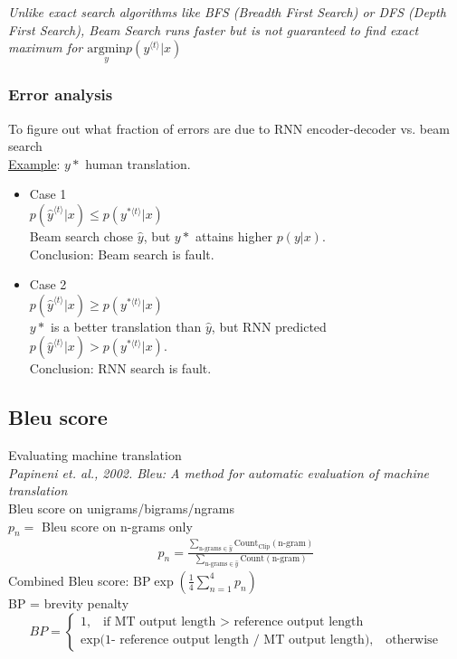 \emph{\textcolor{Bittersweet}{Unlike exact search algorithms like BFS (Breadth First Search) or DFS (Depth First Search), Beam Search runs faster but is not guaranteed to find exact maximum for $\underset{y}{\mathrm{argmin}} p(y^{\langle t \rangle} | x)$}}

\subsubsection{Error analysis}
To figure out what fraction of errors are due to RNN encoder-decoder vs. beam search\\
\underline{Example}: $y*$ human translation.
\begin{itemize}
\item
Case 1\\
$p(\hat{y}^{\langle t \rangle} | x) \leq p(y^{* \langle t \rangle} | x)$\\
Beam search chose $\hat{y}$, but $y*$ attains higher $p(y | x)$.\\
Conclusion: Beam search is fault.
\item
Case 2\\
$p(\hat{y}^{\langle t \rangle} | x) \geq p(y^{* \langle t \rangle} | x)$\\
$y*$ is a better translation than $\hat{y}$, but RNN predicted $p(\hat{y}^{\langle t \rangle} | x) > p(y^{* \langle t \rangle} | x)$.\\
Conclusion: RNN search is fault.
\end{itemize}


%
\subsection{Bleu score}
Evaluating machine translation\\
\textit{Papineni et. al., 2002. Bleu: A method for automatic evaluation of machine translation}\\
Bleu score on unigrams/bigrams/ngrams\\
$p_n = $ Bleu score on n-grams only
\begin{align}
p_n = \frac{\sum_{\text{n-grams} \in \hat{y}} \text{Count}_{\text{Clip}}(\text{n-gram})} {\sum_{\text{n-grams} \in \hat{y}} {\text{Count}(\text{n-gram})}}
\end{align}
Combined Bleu score: $\displaystyle \text{BP}\exp(\frac{1}{4}\sum_{n=1}^4 p_n)$\\
BP = brevity penalty\\
\begin{equation*}
BP = \left\{ \begin{array}{l} \text{1, ~ if MT output length > reference output length}\\
\text{exp(1- reference output length / MT output length), ~ otherwise} \end{array} \right.
\end{equation*}


